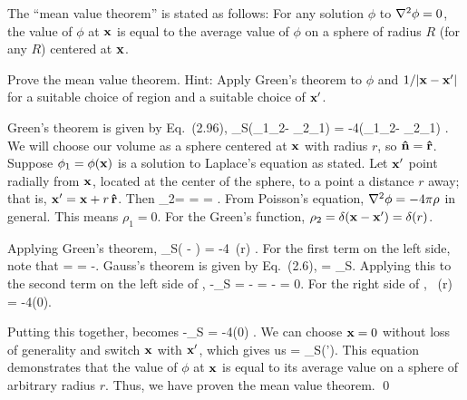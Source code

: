 \newcommand{\phiq}{\phi_1}
\newcommand{\phiw}{\phi_2}
\newcommand{\rhoq}{\rho_1}
\newcommand{\rhow}{\rho_2}
\newcommand{\intS}{\int_S}
\newcommand{\dS}{\dd{S}}
\newcommand{\vv}{\vec{v}}
\newcommand{\phixp}{\phi(\vx')}

\begin{statement}{}
	The ``mean value theorem'' is stated as follows: For any solution $\phi$ to $\nabla^2 \phi = 0$, the value of $\phi$ at $\mathbf{x}$ is equal to the average value of $\phi$ on a sphere of radius $R$ (for any $R$) centered at $\mathbf{x}$.
\end{statement}

\begin{problem} \label{5a}
	Prove the mean value theorem.  Hint: Apply Green's theorem to $\phi$ and $1/\abs{\mathbf{x} - \mathbf{x}'}$ for a suitable choice of region and a suitable choice of $\mathbf{x}'$.
\end{problem}

\begin{solution}
	Green's theorem is given by Eq.~(2.96),
	\beq
		\intS \nh \cdot (\phiq \nabla\phiw - \phiw \nabla\phiq) \dS = -4\pi \intV (\phiq \rhow - \phiw \rhoq) \dcx.
	\eeq
	We will choose our volume as a sphere centered at $\mathbf{x}$ with radius $r$, so $\mathbf{\hat{n}} = \mathbf{\hat{r}}$.  Suppose $\phiq = \phix$ is a solution to Laplace's equation as stated.  Let $\mathbf{x}'$ point radially from $\mathbf{x}$, located at the center of the sphere, to a point a distance $r$ away; that is, $\mathbf{x}' = \mathbf{x} + r \, \mathbf{\hat{r}}$.  Then
	\beq
		\phiw =  =  = .
	\eeq
	From Poisson's equation, $\nabla^2\phi = -4\pi\rho$ in general.  This means $\rhoq = 0$.  For the Green's function, $\rhow = \delta(\vx - \vx') = \delta(r)$.
	
	Applying Green's theorem,
	\beqn \label{gt}
		\intS \rh \cdot \left( \phix \nabla{} -  \nabla\phix \right) \dS = -4\pi \intV \phi \, \delta(r) \dcx.
	\eeqn
	For the first term on the left side, note that
	\beq
		\rh \cdot \phix \nabla{} = \phix {}  \rh \cdot \rh = -.
	\eeq
	Gauss's theorem is given by Eq.~(2.6),
	\beq
		\intV \nabla \cdot \vv \dcx = \intS \vv \cdot \nh \dS.
	\eeq
	Applying this to the second term on the left side of ,
	\beq
		-\intS \rh \cdot {} \nabla\phix \dS = - \intV \nabla \cdot \nabla\phix \dcx
		= - \lap\phix
		= 0.
	\eeq
	For the right side of ,
	\pi \intV \phix \, \delta(r) \dcx = -4\pi \phi(0).
	\eeq
	
	Putting this together,  becomes
	\beq
		-\intS {} \dS = -4\pi \phi(0) \dS.
	\eeq
	We can choose $\mathbf{x} = 0$ without loss of generality and switch $\mathbf{x}$ with $\mathbf{x}'$, which gives us
	\beqn \label{mvt}
		\phix =  \intS \phixp {}.
	\eeqn
	This equation demonstrates that the value of $\phi$ at $\mathbf{x}$ is equal to its average value on a sphere of arbitrary radius $r$.  Thus, we have proven the mean value theorem. \qed
\end{solution}


